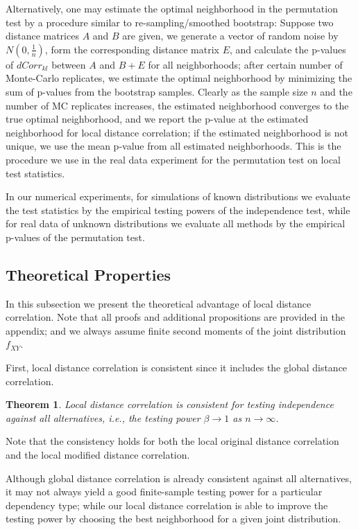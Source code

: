 \documentclass[11pt]{article}
\newtheorem{thm}{Theorem}
\begin{document}
Alternatively, one may estimate the optimal neighborhood in the permutation test by a procedure similar to re-sampling/smoothed bootstrap: Suppose two distance matrices $A$ and $B$ are given, we generate a vector of random noise by $N(0,\frac{1}{n})$, form the corresponding distance matrix $E$, and calculate the p-values of $dCorr_{kl}$ between $A$ and $B+E$ for all neighborhoods; after certain number of Monte-Carlo replicates, we estimate the optimal neighborhood by minimizing the sum of p-values from the bootstrap samples. Clearly as the sample size $n$ and the number of MC replicates increases, the estimated neighborhood converges to the true optimal neighborhood, and we report the p-value at the estimated neighborhood for local distance correlation; if the estimated neighborhood is not unique, we use the mean p-value from all estimated neighborhoods. This is the procedure we use in the real data experiment for the permutation test on local test statistics.

In our numerical experiments, for simulations of known distributions we evaluate the test statistics by the empirical testing powers of the independence test, while for real data of unknown distributions we evaluate all methods by the empirical p-values of the permutation test.

\subsection{Theoretical Properties}
\label{main4}
In this subsection we present the theoretical advantage of local distance correlation. Note that all proofs and additional propositions are provided in the appendix; and we always assume finite second moments of the joint distribution $f_{XY}$.

First, local distance correlation is consistent since it includes the global distance correlation.
\begin{thm}
\label{thm1}
Local distance correlation is consistent for testing independence against all alternatives, i.e., the testing power $\beta \rightarrow 1$ as $n \rightarrow \infty$. 
\end{thm}
Note that the consistency holds for both the local original distance correlation and the local modified distance correlation.

Although global distance correlation is already consistent against all alternatives, it may not always yield a good finite-sample testing power for a particular dependency type; while our local distance correlation is able to improve the testing power by choosing the best neighborhood for a given joint distribution. 
\end{document}

